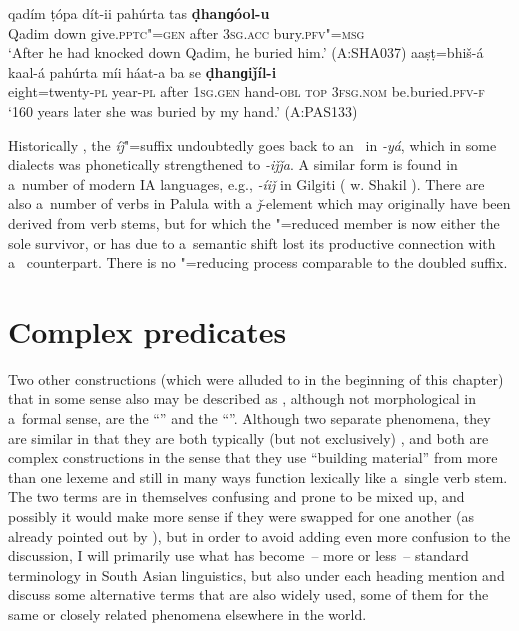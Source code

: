 \begin{exe}
\ea
\label{ex:8-17}
\gll qadím ṭópa dít-ii pahúrta tas \textbf{ḍhanɡóol-u} \\
Qadim down give.\textsc{pptc"=gen} after \textsc{3sg.acc} bury.\textsc{pfv"=msg}\\
\glt `After he had knocked down Qadim, he buried him.' (A:SHA037) 
\ex
\label{ex:8-18}
\gll aaṣṭ=bhiš-á kaal-á pahúrta míi háat-a ba se  \textbf{ḍhanɡiǰíl-i}\\
eight=twenty-\textsc{pl} year-\textsc{pl} after \textsc{1sg.gen} hand-\textsc{obl} \textsc{top} \textsc{3fsg.nom} be.buried.\textsc{pfv-f}\\
\glt `160 years later she was buried by my hand.' (A:PAS133)
\z


Historically \citep[316--317]{masica1991}, the \textit{íǰ}"=suffix undoubtedly goes back to an~\iliOIA {} in \textit{-yá}, which in some \iliMIA dialects was phonetically strengthened to \textit{-iǰǰa}. A similar form is found in a~number of modern IA languages, e.g., \textit{-íiǰ} in Gilgiti \iliShina (\citeauthor{radloffshakil1998} w. Shakil \citeyear[116]{radloffshakil1998}). There are also a~number of  verbs in Palula with a \textit{ǰ}-element which may originally have been derived from  verb stems, but for which the "=reduced member is now either the sole survivor, or has due to a~semantic shift lost its productive connection with a~ counterpart. There is no "=reducing process comparable to the doubled  suffix.


\section{Complex predicates}
\label{sec:8-6}


Two other constructions (which were alluded to in the beginning of this chapter) that in some sense also may be described as , although not morphological in a~formal sense, are the ``'' and the ``''. Although two separate phenomena, they are similar in that they are both typically (but not exclusively) \iliIndoAryan, and both are complex constructions in the sense that they use ``building material'' from more than one lexeme and still in many ways function lexically like a~single verb stem. The two terms are in themselves confusing and prone to be mixed up, and possibly it would make more sense if they were swapped for one another (as already pointed out by \citealt[326]{masica1991}), but in order to avoid adding even more confusion to the discussion, I will primarily use what has become~-- more or less~-- standard terminology in South Asian linguistics, but also under each heading mention and discuss some alternative terms that are also widely used, some of them for the same or closely related phenomena elsewhere in the world.



\end{exe}
